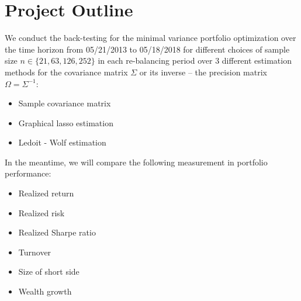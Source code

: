 \documentclass{article}
\begin{document}
\section{Project Outline}
We conduct the back-testing for the minimal variance portfolio optimization over the time horizon from 05/21/2013 to 05/18/2018 for different choices of sample size $n\in\{21, 63, 126, 252\}$ in each re-balancing period over 3 different estimation methods for the covariance matrix $\Sigma$ or its inverse -- the precision matrix $\Omega = \Sigma^{-1}$:
\begin{itemize}
	\item Sample covariance matrix
	\item Graphical lasso estimation
	\item Ledoit - Wolf estimation
\end{itemize}
In the meantime, we will compare the following measurement in portfolio performance:
\begin{itemize}
	\item Realized return
	\item Realized risk
	\item Realized Sharpe ratio
	\item Turnover
	\item Size of short side
	\item Wealth growth
\end{itemize}
\end{document}
